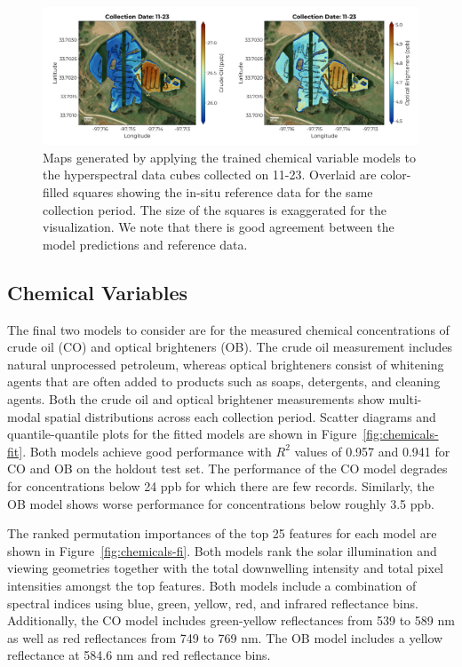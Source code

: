 \documentclass[remotesensing,article,submit,pdftex,moreauthors]{Definitions/mdpi}
\begin{document}
\begin{figure}
\centering
\vspace{-0.3in}
\includegraphics[width=\columnwidth]{paper/figures/results/maps/chemical.pdf}
\vspace{-0.25in}
\caption{Maps generated by applying the trained chemical variable models to the hyperspectral data cubes collected on 11-23. Overlaid are color-filled squares showing the in-situ reference data for the same collection period. The size of the squares is exaggerated for the visualization. We note that there is good agreement between the model predictions and reference data.\label{fig:map-chem}}
\end{figure}  

\subsection{Chemical Variables}

The final two models to consider are for the measured chemical concentrations of crude oil (CO) and optical brighteners (OB). The crude oil measurement includes natural unprocessed petroleum, whereas optical brighteners consist of whitening agents that are often added to products such as soaps, detergents, and cleaning agents. Both the crude oil and optical brightener measurements show multi-modal spatial distributions across each collection period. Scatter diagrams and quantile-quantile plots for the fitted models are shown in Figure~\ref{fig:chemicals-fit}. Both models achieve good performance with $R^2$ values of 0.957 and 0.941 for CO and OB on the holdout test set. The performance of the CO model degrades for concentrations below 24 ppb for which there are few records. Similarly, the OB model shows worse performance for concentrations below roughly 3.5 ppb.

The ranked permutation importances of the top 25 features for each model are shown in Figure~\ref{fig:chemicals-fi}. Both models rank the solar illumination and viewing geometries together with the total downwelling intensity and total pixel intensities amongst the top features. Both models include a combination of spectral indices using blue, green, yellow, red, and infrared reflectance bins. Additionally, the CO model includes green-yellow reflectances from 539 to 589 nm as well as red reflectances from 749 to 769 nm. The OB model includes a yellow reflectance at 584.6 nm and red reflectance bins.
\end{document}
